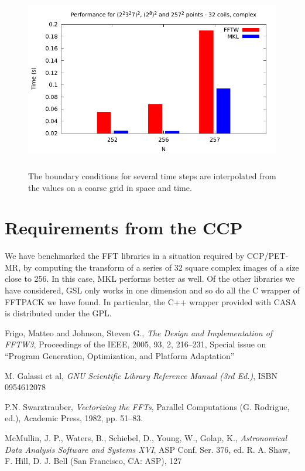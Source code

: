 \documentclass[12pt, a4paper]{article}
\begin{document}
\begin{figure}[H]
\captionsetup{width=0.6\textwidth}
\centering
\includegraphics[height=8cm]{graphs/ccp/ccp.pdf}
\caption{The boundary conditions for several time steps are interpolated from the values on a coarse grid in space and time.}
\label{method}
\end{figure}

\section{Requirements from the CCP}
We have benchmarked the FFT libraries in a situation required by CCP/PET-MR, by computing the transform of a series of 32 square complex images of a size close to 256. In this case, MKL performs better as well. Of the other libraries we have considered, GSL only works in one dimension and so do all the C wrapper of FFTPACK we have found. In particular, the C++ wrapper provided with CASA is distributed under the GPL.    

\begin{thebibliography}{9}

Frigo, Matteo and Johnson, Steven G.,
{\it The Design and Implementation of FFTW3},
Proceedings of the IEEE,
2005,
93,
2,
216--231,
Special issue on ``Program Generation, Optimization, and Platform Adaptation''

M. Galassi et al, {\it GNU Scientific Library Reference Manual (3rd Ed.)}, ISBN 0954612078
  
P.N. Swarztrauber, {\it Vectorizing the FFTs}, Parallel Computations (G. Rodrigue, ed.), Academic Press, 1982, pp. 51--83.
  
  McMullin, J. P., Waters, B., Schiebel, D., Young, W., Golap, K.,
  {\it Astronomical Data Analysis Software and Systems XVI},
  ASP Conf. Ser. 376, ed. R. A. Shaw, F. Hill, D. J. Bell (San Francisco, CA: ASP), 127 

\end{thebibliography}
\end{document}
